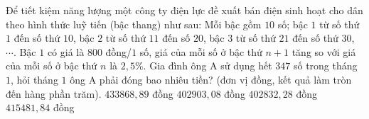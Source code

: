\begin{ex}
Để tiết kiệm năng lượng một công ty điện lực đề xuất bán điện sinh hoạt cho dân theo hình thức luỹ tiến (bậc thang) như sau: Mỗi bậc gồm $ 10  $ số; bậc $ 1 $ từ số thứ $ 1 $ đến số thứ $ 10 $, bậc $ 2 $ từ số thứ $ 11 $ đến số $ 20 $, bậc $ 3 $ từ số thứ $ 21 $	đến số thứ $ 30 $, $ \cdots $. Bậc $ 1 $ có giá là $ 800 $ đồng/$ 1 $ số, giá của mỗi số ở bậc thứ $ n + 1 $ tăng so với giá của mỗi số ở bậc thứ $ n $ là $ 2{ , }5\% $. Gia đình ông A sử dụng hết $ 347 $ số trong tháng $ 1 $, hỏi tháng $ 1 $ ông A phải đóng bao nhiêu tiền? (đơn vị đồng, kết quả làm tròn đến hàng phần trăm).
	\choice
	{\True $  433868{ , }89 $ đồng}
	{$  402903{ , }08 $ đồng}
	{$  402832{ , }28 $ đồng}
	{$  415481{ , }84 $ đồng}
\end{ex}	

